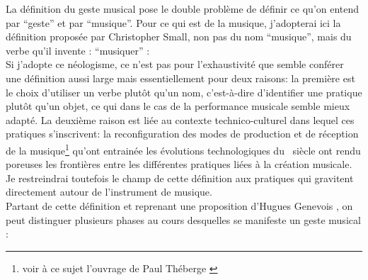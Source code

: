 \noindent La définition du geste musical pose le double problème de définir ce qu'on entend par ``geste'' et par ``musique''. Pour ce qui est de la musique, j'adopterai ici la définition proposée par Christopher Small, non pas du nom ``musique'', mais du verbe qu'il invente : ``musiquer'' \cite{small_musicking:_1998}:
\\
\indent Si j'adopte ce néologisme, ce n'est pas pour l'exhaustivité que semble conférer une définition aussi large mais essentiellement pour deux raisons: la première est le choix d'utiliser un verbe plutôt qu'un nom, c'est-à-dire d'identifier une pratique plutôt qu'un objet, ce qui dans le cas de la performance musicale semble mieux adapté. La deuxième raison est liée au contexte technico-culturel dans lequel ces pratiques s'inscrivent: la reconfiguration des modes de production et de réception de la musique\footnote{voir à ce sujet l'ouvrage de Paul Théberge \cite{theberge_any_1997}} qu'ont entrainée les évolutions technologiques du ~siècle ont rendu poreuses les frontières entre les différentes pratiques liées à la création musicale. Je restreindrai toutefois le champ de cette définition aux pratiques qui gravitent directement autour de l'instrument de musique.\\
\indent Partant de cette définition et reprenant une proposition d'Hugues Genevois \cite{genevois_geste_1999}, on peut distinguer plusieurs phases au cours desquelles se manifeste un geste musical :

